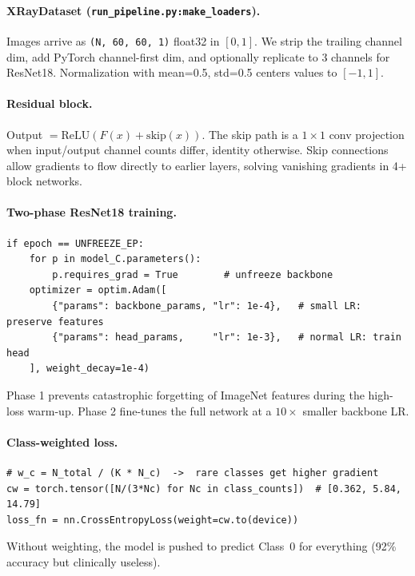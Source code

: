 \documentclass[11pt, letterpaper]{article}
\begin{document}
\paragraph{XRayDataset (\texttt{run\_pipeline.py:make\_loaders}).}
Images arrive as \texttt{(N, 60, 60, 1)} float32 in $[0,1]$.
We strip the trailing channel dim, add PyTorch channel-first dim, and
optionally replicate to 3 channels for ResNet18.
Normalization with mean=0.5, std=0.5 centers values to $[-1,1]$.

\paragraph{Residual block.}
Output $= \text{ReLU}(F(x) + \text{skip}(x))$.
The skip path is a $1\times1$ conv projection when input/output channel counts differ,
identity otherwise. Skip connections allow gradients to flow directly to
earlier layers, solving vanishing gradients in 4+ block networks.

\paragraph{Two-phase ResNet18 training.}
\begin{lstlisting}[caption={Phase switch at epoch 10}]
if epoch == UNFREEZE_EP:
    for p in model_C.parameters():
        p.requires_grad = True        # unfreeze backbone
    optimizer = optim.Adam([
        {"params": backbone_params, "lr": 1e-4},   # small LR: preserve features
        {"params": head_params,     "lr": 1e-3},   # normal LR: train head
    ], weight_decay=1e-4)
\end{lstlisting}
Phase 1 prevents catastrophic forgetting of ImageNet features during the
high-loss warm-up. Phase 2 fine-tunes the full network at a $10\times$
smaller backbone LR.

\paragraph{Class-weighted loss.}
\begin{lstlisting}[caption={Class weight computation and loss setup}]
# w_c = N_total / (K * N_c)  ->  rare classes get higher gradient
cw = torch.tensor([N/(3*Nc) for Nc in class_counts])  # [0.362, 5.84, 14.79]
loss_fn = nn.CrossEntropyLoss(weight=cw.to(device))
\end{lstlisting}
Without weighting, the model is pushed to predict Class~0 for everything
(92\% accuracy but clinically useless).
\end{document}
